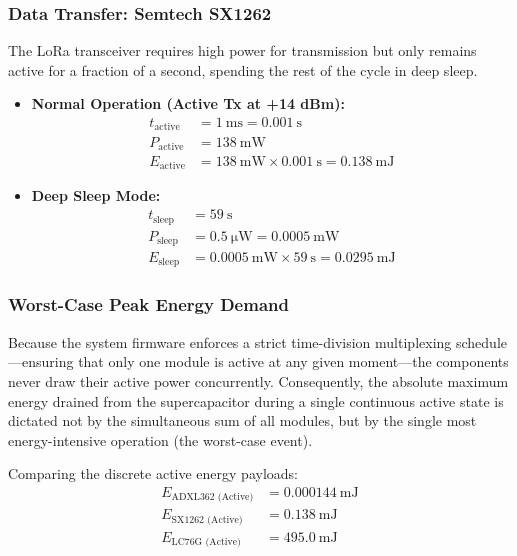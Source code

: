 \documentclass[paper=a4]{article}
\begin{document}
\subsubsection{Data Transfer: Semtech SX1262}
The LoRa transceiver requires high power for transmission but only remains active for a fraction of a second, spending the rest of the cycle in deep sleep.
\begin{itemize}
    \item \textbf{Normal Operation (Active Tx at +14 dBm):}
    \begin{align*}
        t_{\text{active}} &= \SI{1}{\milli\second} = \SI{0.001}{\second} \\
        P_{\text{active}} &= \SI{138}{\milli\watt} \\
        E_{\text{active}} &= \SI{138}{\milli\watt} \times \SI{0.001}{\second} = \SI{0.138}{\milli\joule}
    \end{align*}
    
    \item \textbf{Deep Sleep Mode:}
    \begin{align*}
        t_{\text{sleep}} &= \SI{59}{\second} \\
        P_{\text{sleep}} &= \SI{0.5}{\micro\watt} = \SI{0.0005}{\milli\watt} \\
        E_{\text{sleep}} &= \SI{0.0005}{\milli\watt} \times \SI{59}{\second} = \SI{0.0295}{\milli\joule}
    \end{align*}
\end{itemize}

\subsubsection{Worst-Case Peak Energy Demand}
Because the system firmware enforces a strict time-division multiplexing schedule---ensuring that only one module is active at any given moment---the components never draw their active power concurrently. Consequently, the absolute maximum energy drained from the supercapacitor during a single continuous active state is dictated not by the simultaneous sum of all modules, but by the single most energy-intensive operation (the worst-case event).

Comparing the discrete active energy payloads:
\begin{align*}
    E_{\text{ADXL362 (Active)}} &= \SI{0.000144}{\milli\joule} \\
    E_{\text{SX1262 (Active)}} &= \SI{0.138}{\milli\joule} \\
    E_{\text{LC76G (Active)}} &= \SI{495.0}{\milli\joule}
\end{align*}
\end{document}
